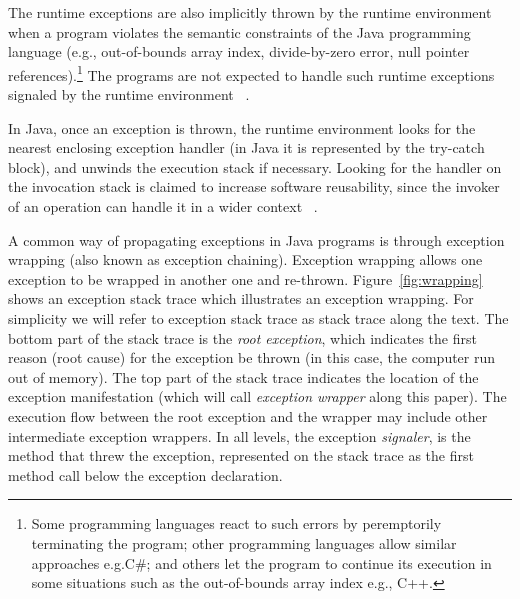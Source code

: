 \documentclass[conference]{IEEEtran}
\begin{document}
The runtime exceptions are also implicitly thrown by the runtime environment when a program violates 
the semantic constraints of the Java programming language (e.g., out-of-bounds array index, divide-by-zero 
error, null pointer references).\footnote{Some programming languages react to such errors by peremptorily terminating the program; 
other programming languages allow similar approaches e.g.C\#; and others let the program to continue
 its execution in some situations such as the out-of-bounds array index e.g., C++. }  
The programs are not expected to handle such runtime exceptions signaled by the runtime environment ~\cite{gosling2000java}. 


In Java, once an exception is thrown, the runtime environment looks for the nearest enclosing exception handler
(in Java it is represented by the try-catch block), and unwinds the execution stack if necessary.
 Looking for the handler on the invocation stack is claimed to increase software reusability, 
since the invoker of an operation can handle it in a wider context ~\cite{miller1997issues}.

 A common way of  propagating exceptions in Java programs is through exception wrapping
 (also known as exception chaining). Exception wrapping allows one exception 
to be wrapped in another one and re-thrown. Figure~\ref{fig:wrapping} shows 
an exception stack trace which illustrates an exception wrapping. 
For simplicity we will refer to exception stack trace as stack trace along the text.
The bottom part of the stack trace is the \emph{root exception}, which indicates
the first reason (root cause) for the exception be thrown (in this case, the computer run out of
memory). The top part of the stack trace indicates the location of the exception
manifestation (which will call \emph{exception wrapper} along this paper). The
execution flow  between the root exception and the wrapper may
include other intermediate exception wrappers. In all levels, the exception
\emph{signaler}, is the method that threw the exception, represented on the
stack trace as the first method call below the exception declaration.
\end{document}
